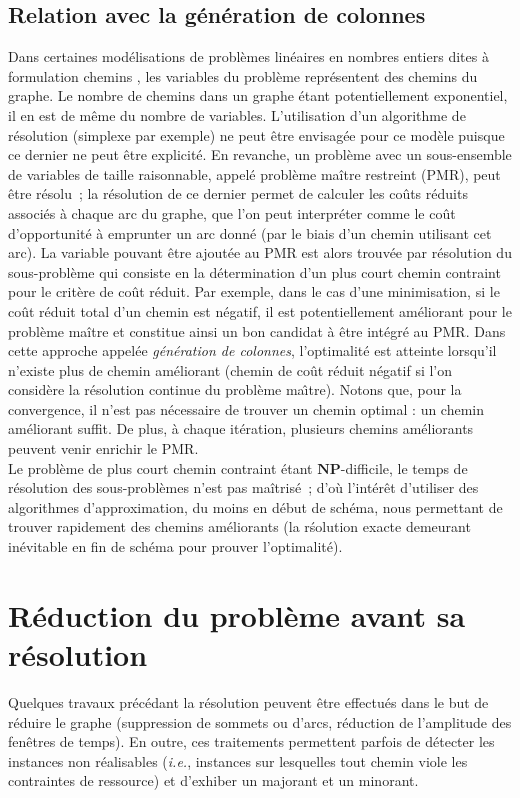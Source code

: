 \documentclass[10pt,francais]{llncs}
\begin{document}
\subsection{Relation avec la g\'en\'eration de colonnes}\label{sub-desc-gc} Dans certaines mod\'elisations de probl\`emes lin\'eaires en nombres entiers dites \`a formulation \og chemins \fg{}, les variables du probl\`eme repr\'esentent des chemins du graphe. Le nombre de chemins dans un graphe \'etant potentiellement exponentiel, il en est de m\^eme du nombre de variables. L'utilisation d'un algorithme de r\'esolution (simplexe par exemple) ne peut \^etre envisag\'ee pour ce mod\`ele puisque ce dernier ne peut \^etre explicit\'e. En revanche, un probl\`eme avec un sous-ensemble de variables de taille raisonnable, appel\'e probl\`eme ma\^itre restreint (PMR), peut \^etre r\'esolu~; la r\'esolution de ce dernier permet de calculer les co\^uts r\'eduits associ\'es \`a chaque arc du graphe, que l'on peut interpr\'eter comme le co\^ut d'opportunit\'e \`a emprunter un arc donn\'e (par le biais d'un chemin utilisant cet arc). La variable pouvant \^etre ajout\'ee au PMR est alors trouv\'ee par r\'esolution du sous-probl\`eme qui consiste en la d\'etermination d'un plus court chemin contraint pour le crit\`ere de co\^ut r\'eduit. Par exemple, dans le cas d'une minimisation, si le co\^ut r\'eduit total d'un chemin est n\'egatif, il est potentiellement am\'eliorant pour le probl\`eme ma\^itre et constitue ainsi un bon candidat \`a \^etre int\'egr\'e au PMR. Dans cette approche appel\'ee {\em g\'en\'eration de colonnes}, l'optimalit\'e est atteinte lorsqu'il n'existe plus de chemin am\'eliorant (chemin de co\^ut r\'eduit n\'egatif si l'on consid\`ere la r\'esolution continue du probl\`eme ma\^{\i}tre). Notons que, pour la convergence, il n'est pas n\'ecessaire de trouver un chemin optimal : un chemin am\'eliorant suffit. De plus, \`a chaque it\'eration, plusieurs chemins am\'eliorants peuvent venir enrichir le PMR. \\
Le probl\`eme de plus court chemin contraint \'etant $\mathbf{NP}$-difficile, le temps de r\'esolution des sous-probl\`emes n'est pas ma\^itris\'e~; d'o\`u l'int\'er\^et d'utiliser des algorithmes d'approximation, du moins en d\'ebut de sch\'ema, nous permettant de trouver rapidement des chemins am\'eliorants (la r\'solution exacte demeurant in\'evitable en fin de sch\'ema pour prouver l'optimalit\'e). 


\section{R\'eduction du probl\`eme avant sa r\'esolution}\label{sec-reduc}
Quelques travaux pr\'ec\'edant la r\'esolution peuvent \^etre effectu\'es dans le but de r\'eduire le graphe (suppression de sommets ou d'arcs, r\'eduction de l'amplitude des fen\^etres de temps). En outre, ces traitements permettent parfois de d\'etecter les instances non r\'ealisables ({\em i.e.}, instances sur lesquelles tout chemin viole les contraintes de ressource) et d'exhiber un majorant et un minorant.
\end{document}
